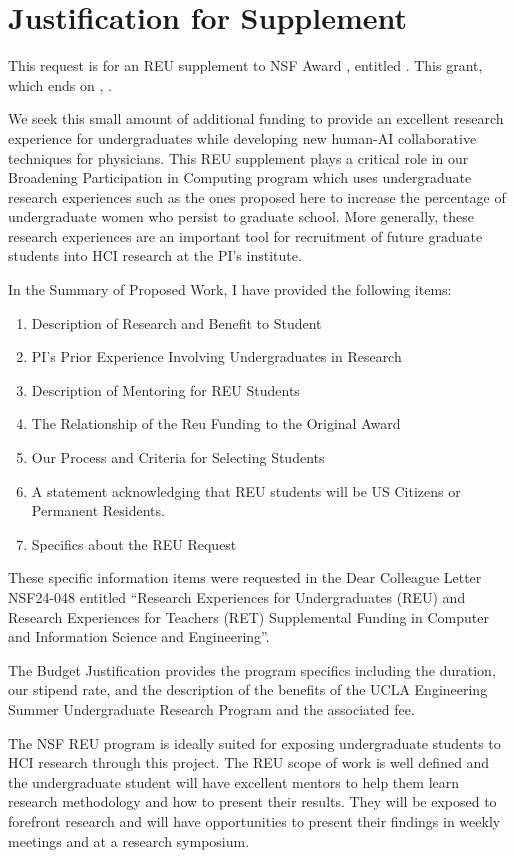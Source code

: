 \section*{Justification for Supplement}

This request is for an REU supplement to NSF Award \awardno, entitled \awardtitle.  
This grant, which ends on \awardenddate, 
\awardsummary.

We seek this small amount of additional funding to provide an excellent research experience for undergraduates while developing new human-AI collaborative techniques for physicians.  
This REU supplement plays a critical role in our Broadening Participation in Computing program which uses undergraduate research experiences such as the ones proposed here to increase the percentage of undergraduate women who persist to graduate school.  
More generally, these research experiences are an important tool for recruitment of future graduate students into HCI research at the PI's institute.

In the Summary of Proposed Work, I have provided the following items:

\begin{enumerate}
    \item Description of Research and Benefit to Student
    \item PI's Prior Experience Involving Undergraduates in Research
    \item Description of Mentoring for REU Students
    \item The Relationship of the Reu Funding to the Original Award
    \item Our Process and Criteria for Selecting Students
    \item A statement acknowledging that REU students will be US Citizens or Permanent Residents.
    \item Specifics about the REU Request
\end{enumerate}


These specific information items were requested in the Dear Colleague Letter NSF24-048 entitled ``Research Experiences for Undergraduates (REU) and Research Experiences for Teachers (RET) Supplemental Funding in Computer and Information Science and Engineering''.

The Budget Justification provides the program specifics including the duration, our stipend rate, and the description of the benefits of the UCLA Engineering Summer Undergraduate Research Program and the associated fee.

The NSF REU program is ideally suited for exposing undergraduate students to HCI research through this project.
The REU scope of work is well defined and the undergraduate student will have excellent mentors to help them learn research methodology and how to present their results. 
They will be exposed to forefront research and will have opportunities to present their findings in weekly meetings and at a research symposium.